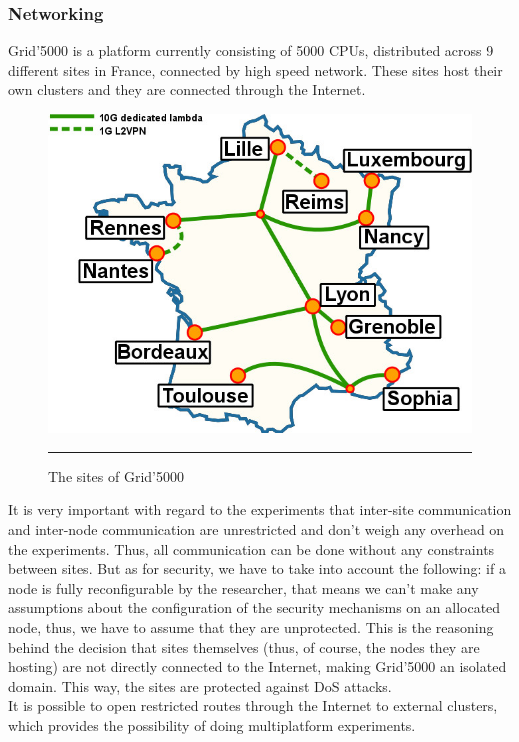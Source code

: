 \subsubsection{Networking}
Grid'5000 is a platform currently consisting of 5000 CPUs, distributed
across 9 different sites in France, connected by high speed
network. These sites host their own clusters and they are connected
through the Internet.
\begin{figure}[htbp]
  \centering
    \includegraphics[scale=2]{./Figures/Renater5-g5k.jpg}
    \rule{35em}{0.5pt}
  \caption[Grid'5000 sites]{The sites of Grid'5000}
  \label{fig:Electron}
\end{figure}
It is very important with regard to the
experiments that inter-site communication and inter-node communication
are unrestricted and don't weigh any overhead on the
experiments. Thus, all communication can be done without any
constraints between sites. But
as for security, we have to take into account the following: if a
node is fully reconfigurable by the researcher, that means we
can't make any assumptions about the configuration of the security
mechanisms on an allocated node, thus, we have to assume that they are
unprotected. This is the reasoning behind the decision that sites
themselves (thus, of course, the nodes they are hosting) are not
directly connected to the Internet, making Grid'5000 an isolated
domain. This way, the sites are protected against DoS attacks.\\
It is possible to open restricted routes through the Internet to
external clusters, which provides the possibility of doing
multiplatform experiments.
